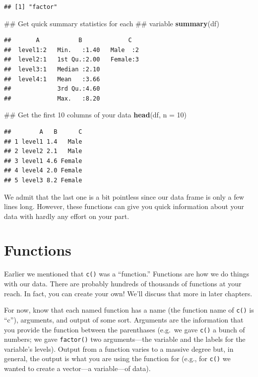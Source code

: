\documentclass[]{tufte-book}
\newenvironment{Shaded}{}{}
\newcommand{\KeywordTok}[1]{\textcolor[rgb]{0.00,0.44,0.13}{\textbf{#1}}}
\newcommand{\DataTypeTok}[1]{\textcolor[rgb]{0.56,0.13,0.00}{#1}}
\newcommand{\DecValTok}[1]{\textcolor[rgb]{0.25,0.63,0.44}{#1}}
\newcommand{\NormalTok}[1]{#1}
\theoremstyle{definition}
\theoremstyle{definition}
\theoremstyle{remark}
\begin{document}
\begin{verbatim}
## [1] "factor"
\end{verbatim}

\begin{Shaded}
\begin{Highlighting}[]
\NormalTok{## Get quick summary statistics for each}
\NormalTok{## variable}
\KeywordTok{summary}\NormalTok{(df)}
\end{Highlighting}
\end{Shaded}

\begin{verbatim}
##       A           B             C    
##  level1:2   Min.   :1.40   Male  :2  
##  level2:1   1st Qu.:2.00   Female:3  
##  level3:1   Median :2.10             
##  level4:1   Mean   :3.66             
##             3rd Qu.:4.60             
##             Max.   :8.20
\end{verbatim}

\begin{Shaded}
\begin{Highlighting}[]
\NormalTok{## Get the first 10 columns of your data}
\KeywordTok{head}\NormalTok{(df, }\DataTypeTok{n =} \DecValTok{10}\NormalTok{)}
\end{Highlighting}
\end{Shaded}

\begin{verbatim}
##        A   B      C
## 1 level1 1.4   Male
## 2 level2 2.1   Male
## 3 level1 4.6 Female
## 4 level4 2.0 Female
## 5 level3 8.2 Female
\end{verbatim}

We admit that the last one is a bit pointless since our data frame is
only a few lines long. However, these functions can give you quick
information about your data with hardly any effort on your part.

\section*{Functions}\label{functions}

Earlier we mentioned that \texttt{c()} was a ``function.'' Functions are
how we do things with our data. There are probably hundreds of thousands
of functions at your reach. In fact, you can create your own! We'll
discuss that more in later chapters.

For now, know that each named function has a name (the function name of
\texttt{c()} is ``c''), arguments, and output of some sort. Arguments
are the information that you provide the function between the
parenthases (e.g.~we gave \texttt{c()} a bunch of numbers; we gave
\texttt{factor()} two arguments---the variable and the labels for the
variable's levels). Output from a function varies to a massive degree
but, in general, the output is what you are using the function for
(e.g., for \texttt{c()} we wanted to create a vector---a variable---of
data).
\end{document}
